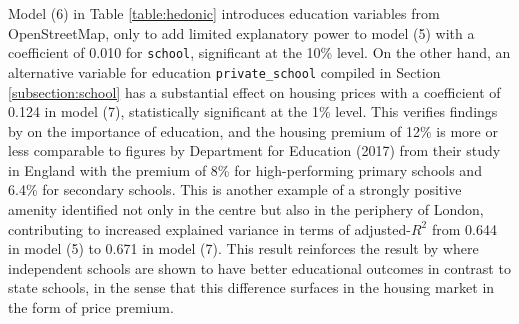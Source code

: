 \documentclass{article}
\begin{document}
Model (6) in  Table \ref{table:hedonic} introduces education variables from OpenStreetMap, only to add limited explanatory power to model (5) with a coefficient of 0.010 for \texttt{school}, significant at the 10\% level. On the other hand, an alternative variable for education \texttt{private\_school} compiled in Section \ref{subsection:school} has a substantial effect on housing prices with a coefficient of 0.124 in model (7), statistically significant at the 1\% level. This verifies findings by \citet{Niu2016ModelingDemand} on the importance of education, and the housing premium of 12\% is more or less comparable to figures by Department for Education (2017) from their study in England with the premium of 8\% for high-performing primary schools and 6.4\% for secondary schools. This is another example of a strongly positive amenity identified not only in the centre but also in the periphery of London, contributing to increased explained variance in terms of adjusted-$R^2$ from 0.644 in model (5) to 0.671 in model (7). This result reinforces the result by \citet{Ndaji2016ACouncil} where independent schools are shown to have better educational outcomes in contrast to state schools, in the sense that this difference surfaces in the housing market in the form of price premium.\\\\
\end{document}
